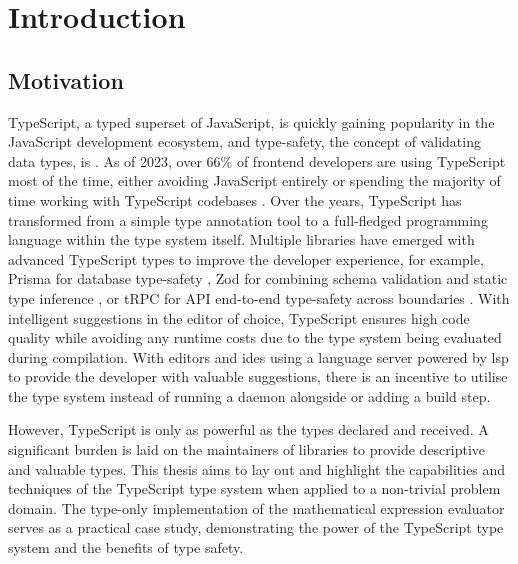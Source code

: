 \chapter{Introduction}

\section{Motivation}

TypeScript, a typed superset of JavaScript, is quickly gaining popularity in the JavaScript development ecosystem, and type-safety, the concept of validating data types, is \cite{jsworldconferenceFredSchottTypesafety2023}. As of 2023, over 66\% of frontend developers are using TypeScript most of the time, either avoiding JavaScript entirely or spending the majority of time working with TypeScript codebases \cite{StateJS2022}. Over the years, TypeScript has transformed from a simple type annotation tool to a full-fledged programming language within the type system itself. Multiple libraries have emerged with advanced TypeScript types to improve the developer experience, for example, Prisma for database type-safety \cite{PrismaPrismaNextgeneration}, Zod for combining schema validation and static type inference \cite{mcdonnellZod2023}, or tRPC for API end-to-end type-safety across boundaries \cite{TRPC2023}. With intelligent suggestions in the editor of choice, TypeScript ensures high code quality while avoiding any runtime costs due to the type system being evaluated during compilation. With editors and \acrshort{ide}s using a language server powered by \acrfull{lsp} to provide the developer with valuable suggestions, there is an incentive to utilise the type system instead of running a daemon alongside or adding a build step.

However, TypeScript is only as powerful as the types declared and received. A significant burden is laid on the maintainers of libraries to provide descriptive and valuable types. This thesis aims to lay out and highlight the capabilities and techniques of the TypeScript type system when applied to a non-trivial problem domain. The type-only implementation of the mathematical expression evaluator serves as a practical case study, demonstrating the power of the TypeScript type system and the benefits of type safety.

